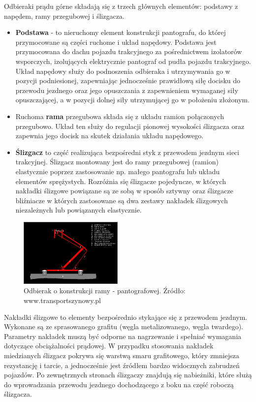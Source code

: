 Odbieraki prądu górne składają się z trzech głównych elementów: podstawy z napędem, ramy przegubowej i ślizgacza. 
\begin{itemize}
	\item \textbf{Podstawa} - to nieruchomy element konstrukcji pantografu, do której przymocowane są części ruchome i układ napędowy. Podstawa jest przymocowana do dachu pojazdu trakcyjnego za pośrednictwem izolatorów wsporczych, izolujących elektrycznie pantograf od pudła pojazdu trakcyjnego. Układ napędowy służy do podnoszenia odbieraka i utrzymywania go w pozycji podniesionej, zapewniając jednocześnie prawidłową siłę docisku do przewodu jezdnego oraz jego opuszczania z zapewnieniem wymaganej siły opuszczającej, a w pozycji dolnej siły utrzymującej go w położeniu złożonym. 

	\item Ruchoma \textbf{rama} przegubowa składa się z układu ramion połączonych przegubowo. Układ ten służy do regulacji pionowej wysokości ślizgacza oraz zapewnia jego docisk na skutek działania układu napędowego. 
	
	
	\item \textbf{Ślizgacz} to część realizująca bezpośredni styk z przewodem jezdnym sieci trakcyjnej. Ślizgacz montowany jest do ramy przegubowej (ramion) elastycznie poprzez zastosowanie np. małego pantografu lub układu elementów sprężystych. Rozróżnia się ślizgacze pojedyncze, w których nakładki ślizgowe powiązane są ze sobą w sposób sztywny oraz ślizgacze bliźniacze w których zastosowane są dwa zestawy nakładek ślizgowych niezależnych lub powiązanych elastycznie. 
\end{itemize}
\begin{figure}
	\includegraphics[width=0.45\textwidth]{skryptkierownik-img/kolodbierakschem2.png}
	\caption{Odbierak o konstrukcji ramy - pantografowej. Źródło: www.transportszynowy.pl}
	\label{fig:pantograf2}
\end{figure}	
Nakładki ślizgowe to elementy bezpośrednio stykające się z przewodem jezdnym. Wykonane są ze sprasowanego grafitu (węgla metalizowanego, węgla twardego). Parametry nakładek muszą być odporne na nagrzewanie i spełniać wymagania dotyczące obciążalności prądowej. W przypadku stosowania nakładek miedzianych ślizgacz pokrywa się warstwą smaru grafitowego, który zmniejsza rezystancję i tarcie, a jednocześnie jest źródłem bardzo widocznych zabrudzeń pojazdów. 
Po zewnętrznych stronach ślizgaczy znajdują się nabieżniki, które służą do wprowadzania przewodu jezdnego dochodzącego z boku na część roboczą ślizgacza. 

